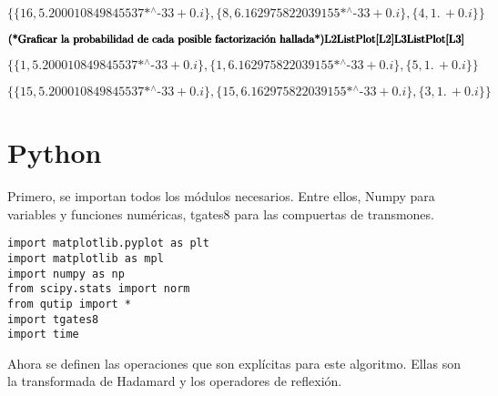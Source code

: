 \begin{doublespace}
\noindent\(\{\{16,\text{5.200010849845537$\grave{ }$*${}^{\wedge}$-33}+0. i\},\{8,\text{6.162975822039155$\grave{ }$*${}^{\wedge}$-33}+0. i\},\{4,1.\,
+0. i\}\}\)
\end{doublespace}

\begin{doublespace}
\noindent\(\pmb{\text{(*Graficar la probabilidad de cada posible factorizaci{\' o}n hallada*)}}\\
\pmb{\text{L2}}\\
\pmb{\text{ListPlot}[\text{L2}]}\\
\pmb{\text{L3}}\\
\pmb{\text{ListPlot}[\text{L3}]}\)
\end{doublespace}

\begin{doublespace}
\noindent\(\{\{1,\text{5.200010849845537$\grave{ }$*${}^{\wedge}$-33}+0. i\},\{1,\text{6.162975822039155$\grave{ }$*${}^{\wedge}$-33}+0. i\},\{5,1.\,
+0. i\}\}\)
\end{doublespace}

\begin{doublespace}
\noindent\(\{\{15,\text{5.200010849845537$\grave{ }$*${}^{\wedge}$-33}+0. i\},\{15,\text{6.162975822039155$\grave{ }$*${}^{\wedge}$-33}+0. i\},\{3,1.\,
+0. i\}\}\)
\end{doublespace}

\section{Python}

Primero, se importan todos los módulos necesarios. Entre ellos, Numpy para variables y funciones numéricas, tgates8 para las compuertas de transmones.

\begin{verbatim}
import matplotlib.pyplot as plt
import matplotlib as mpl
import numpy as np
from scipy.stats import norm
from qutip import *
import tgates8
import time
\end{verbatim}

Ahora se definen las operaciones que son explícitas para este algoritmo. Ellas son la transformada de Hadamard y los operadores de reflexión.

